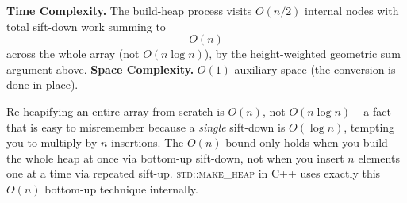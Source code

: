 \begin{complexitybox}
\textbf{Time Complexity.} The build-heap process visits $O(n/2)$ internal
nodes with total sift-down work summing to
\[
  O(n)
\]
across the whole array (not $O(n \log n)$), by the height-weighted
geometric sum argument above.
\textbf{Space Complexity.} $O(1)$ auxiliary space (the conversion is done
in place).
\end{complexitybox}

\begin{takeawaybox}
Re-heapifying an entire array from scratch is $O(n)$, not $O(n \log n)$ --
a fact that is easy to misremember because a \emph{single} sift-down is
$O(\log n)$, tempting you to multiply by $n$ insertions. The $O(n)$ bound
only holds when you build the whole heap at once via bottom-up sift-down,
not when you insert $n$ elements one at a time via repeated sift-up.
\textsc{std::make\_heap} in C++ uses exactly this $O(n)$ bottom-up
technique internally.
\end{takeawaybox}
